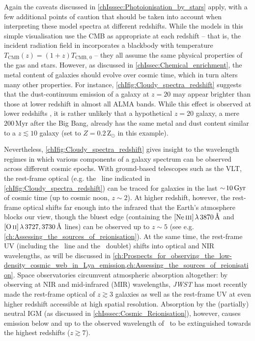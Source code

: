 Again the caveats discussed in \cref{chIsssec:Photoionisation_by_stars} apply, with a few additional points of caution that should be taken into account when interpreting these model spectra at different redshifts. While the models in this simple visualisation use the CMB as appropriate at each redshift -- that is, the incident radiation field in  incorporates a blackbody with temperature $T_\text{CMB} (z) = (1+z) T_{\text{CMB}, \, 0}$ -- they all assume the same physical properties of the gas and stars. However, as discussed in \cref{chIssec:Chemical_enrichment}, the metal content of galaxies should evolve over cosmic time, which in turn alters many other properties. For instance, \cref{chIfig:Cloudy_spectra_redshift} suggests that the dust-continuum emission of a galaxy at $z = 20$ may appear brighter than those at lower redshift in almost all ALMA bands. While this effect is observed at lower redshifts \citep[the ``negative-$K$ correction'';][]{2014PhR...541...45C}, it is rather unlikely that a hypothetical $z = 20$ galaxy, a mere $200 \, \mathrm{Myr}$ after the Big Bang, already has the same metal and dust content similar to a $z \lesssim 10$ galaxy (set to $Z = 0.2 \, \mathrm{Z_\odot}$ in this example).

Nevertheless, \cref{chIfig:Cloudy_spectra_redshift} gives insight to the wavelength regimes in which various components of a galaxy spectrum can be observed across different cosmic epochs. With ground-based telescopes such as the VLT, the rest-frame optical (e.g. the \Halpha\ line indicated in \cref{chIfig:Cloudy_spectra_redshift}) can be traced for galaxies in the last $\sim \! 10 \, \mathrm{Gyr}$ of cosmic time (up to cosmic noon, $z \sim 2$). At higher redshift, however, the rest-frame optical shifts far enough into the infrared that the Earth's atmosphere blocks our view, though the bluest edge (containing the $\NeIII \, \lambda \, 3870 \, \Angstrom$ and $\OII \, \lambda \, 3727, 3730 \, \Angstrom$ lines) can be observed up to $z \sim 5$ (see e.g. \cref{ch:Assessing_the_sources_of_reionisation}). At the same time, the rest-frame UV (including the \lya\ line and the \CIII\ doublet) shifts into optical and NIR wavelengths, as will be discussed in \cref{ch:Prospects_for_observing_the_low-density_cosmic_web_in_Lya_emission,ch:Assessing_the_sources_of_reionisation}. Space observatories circumvent atmospheric absorption altogether: by observing at NIR and mid-infrared (MIR) wavelengths, \textit{JWST} has most recently made the rest-frame optical of $z \gtrsim 3$ galaxies as well as the rest-frame UV at even higher redshift accessible at high spatial resolution. Absorption by the (partially) neutral IGM (as discussed in \cref{chIsssec:Cosmic_Reionisation}), however, causes emission below and up to the observed wavelength of \lya\ to be extinguished towards the highest redshifts ($z \gtrsim 7$).

